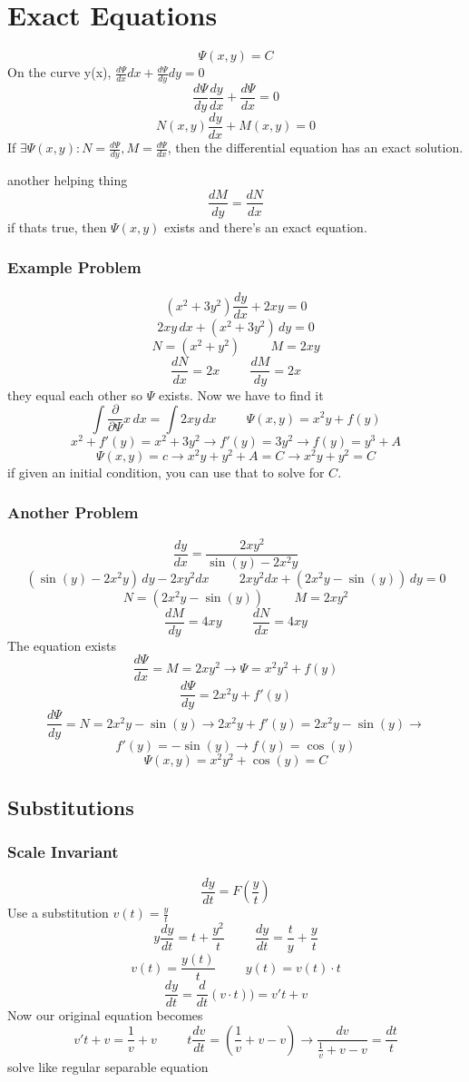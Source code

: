 \documentclass[fleqn]{report}
\newcommand{\hp}{\hspace{1cm}}
\newcommand{\pderiv}[1]{ \frac{\partial}{ \partial #1} }
\begin{document}
\chapter{Exact Equations}
\[
\Psi (x, y) = C
\]
On the curve y(x), $\frac{d \Psi}{dx}dx + \frac{d \Psi}{dy} dy = 0$
\[
\frac{d \Psi}{dy} \frac{dy}{dx} + \frac{d \Psi}{dx} = 0
\]
\[
N(x, y)\frac{dy}{dx} + M(x, y) = 0
\]
If $\exists \Psi (x, y): N = \frac{d \Psi}{dy}, M = \frac{d \Psi}{dx}$, then the differential equation has an exact solution.

another helping thing
\[
\frac{dM}{dy} = \frac{dN}{dx}
\]
if thats true, then $\Psi (x, y)$ exists and there's an exact equation.

\subsection{Example Problem}
\[
(x^2 + 3y^2) \frac{dy}{dx} + 2xy = 0
\]
\[
2xy \, dx + (x^2 + 3y^2) \, dy = 0
\]
\[
N = (x^2 + y^2)
\hp
M = 2xy
\]
\[
\frac{dN}{dx} = 2x
\hp
\frac{dM}{dy} = 2x
\]
they equal each other so $\Psi$ exists. Now we have to find it
\[
\int \pderiv{\Psi}{x} \, dx =  \int 2xy \, dx
\hp
\Psi(x, y) = x^2y + f(y)
\]
\[
x^2 + f'(y) = x^2 + 3y^2
\longrightarrow
f'(y) = 3y^2
\rightarrow
f(y) = y^3 + A
\]
\[
\Psi (x, y) = c 
\longrightarrow
x^2y + y^2 + A = C
\rightarrow
x^2y + y^2 = C
\]
if given an initial condition, you can use that to solve for $C$.
 
 \newpage
\subsection{Another Problem}
\[
\frac{dy}{dx} = \frac{2xy^2}{\sin(y) - 2x^2y}
\]
\[
(\sin(y) -  2x^2y) \, dy - 2xy^2 dx 
\hp
2xy^2 dx + (2x^2y - \sin(y)) \, dy = 0
\]
\[
N = (2x^2y - \sin(y))
\hp
M = 2xy^2
\]
\[
\frac{dM}{dy} = 4xy
\hp
\frac{dN}{dx} = 4xy
\]
The equation exists
\[
\frac{d \Psi}{dx} = M = 2xy^2
\rightarrow
\Psi = x^2y^2 + f(y)
\]
\[
\frac{d\Psi}{dy} = 2x^2y + f'(y)
\]
\[
\frac{d \Psi}{dy} = N = 2x^2y - \sin(y)
\longrightarrow
2x^2y + f'(y) = 2x^2y - \sin(y)
\rightarrow
\]
\[
f'(y) = -\sin(y)
\rightarrow
f(y) = \cos(y)
\]
\[
\Psi (x, y) = x^2y^2 + \cos (y) = C
\]

\newpage
\section{Substitutions}
\subsection{Scale Invariant}
\[
\frac{dy}{dt} = F \left( \frac{y}{t} \right)
\]
Use a substitution $v(t) = \frac{y}{t}$
\[
y \frac{dy}{dt} = t + \frac{y^2}{t}
\hp
\frac{dy}{dt} = \frac{t}{y} + \frac{y}{t}
\]
\[
v(t) = \frac{y(t)}{t}
\hp
y(t) = v(t) \cdot t
\]
\[
\frac{dy}{dt} = \frac{d}{dt} (v \cdot t) )
=
v't + v
\]
Now our original equation becomes
\[
v't + v = \frac{1}{v} + v 
\hp
t \frac{dv}{dt} = \left( \frac{1}{v} + v - v \right)
\rightarrow
\frac{dv}{\frac{1}{v} + v - v} = \frac{dt}{t}
\]
solve like regular separable equation
\end{document}
